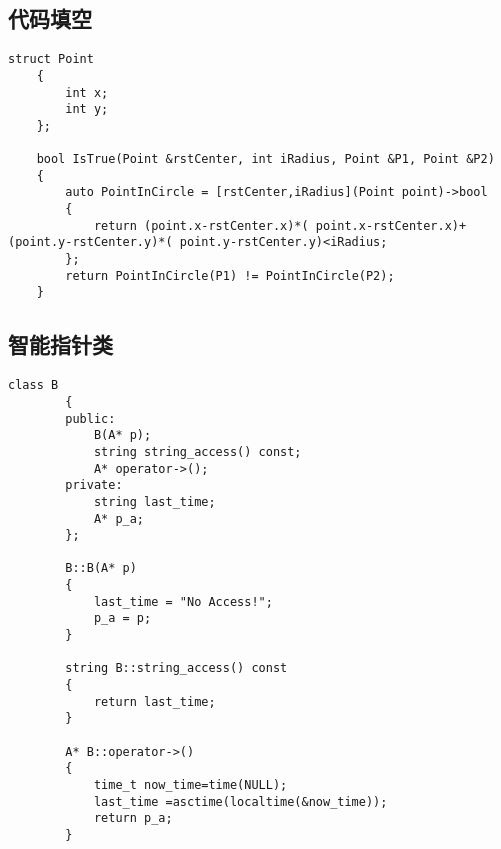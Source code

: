 \documentclass[UTF8]{ctexart}
\begin{document}
 \subsection{代码填空}
\begin{lstlisting}[language={[ANSI]C++}]
    struct Point
    {
        int x;
        int y;
    };
    
    bool IsTrue(Point &rstCenter, int iRadius, Point &P1, Point &P2)
    {
        auto PointInCircle = [rstCenter,iRadius](Point point)->bool
        {   
            return (point.x-rstCenter.x)*( point.x-rstCenter.x)+(point.y-rstCenter.y)*( point.y-rstCenter.y)<iRadius;
        };
        return PointInCircle(P1) != PointInCircle(P2);
    }    
\end{lstlisting}
\subsection{智能指针类}
    \begin{lstlisting}[language={[ANSI]C++}]
        class B
        {
        public:
            B(A* p);
            string string_access() const;
            A* operator->();
        private:
            string last_time;
            A* p_a;
        };
        
        B::B(A* p)
        {
            last_time = "No Access!";
            p_a = p;
        }
        
        string B::string_access() const
        {
            return last_time;
        }
        
        A* B::operator->()
        {
            time_t now_time=time(NULL);
            last_time =asctime(localtime(&now_time));
            return p_a;
        }
                
\end{lstlisting}
\end{document}
